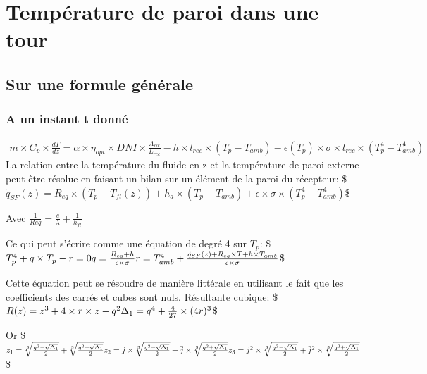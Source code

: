\documentclass[letterpaper,10pt,english]{sphinxmanual}
\begin{document}
\chapter{Température de paroi dans une tour}
\label{\detokenize{Part4/BilanT4:temperature-de-paroi-dans-une-tour}}\label{\detokenize{Part4/BilanT4::doc}}

\section{Sur une formule générale}
\label{\detokenize{Part4/BilanT4:sur-une-formule-generale}}

\subsection{A un instant t donné}
\label{\detokenize{Part4/BilanT4:a-un-instant-t-donne}}\begin{equation}\label{equation:Part4/BilanT4:eqGenTFixed}
\begin{split}
\dot{m} \times C_p \times \frac{dT}{dz} = \alpha \times \eta_{opt} \times DNI \times \frac{A_{col}}{L_{rec}} - h \times l_{rec} \times (T_p-T_{amb}) - \epsilon (T_p) \times \sigma \times l_{rec} \times (T_p^4-T_{amb}^4)
\end{split}
\end{equation}
La relation entre la température du fluide en z et la température de paroi externe peut être résolue en faisant un bilan sur un élément de la paroi du récepteur:
\$\(
\dot{q}_{SF} (z) = R_{eq}  \times (T_p -T_{fl}(z)) + h_a  \times (T_p-T_{amb} ) + \epsilon \times \sigma  \times (T_p^4-T_{amb}^4) 
\)\$

Avec \(\frac{1}{Req} = \frac{e}{\lambda}+\frac{1}{h_{fl}}\)

Ce qui peut s’écrire comme une équation de degré 4 sur \(T_p\):
\$\(
T_p^4+ q \times T_p - r =0 \\
 q= \frac{R_{eq} + h}{\epsilon \times \sigma} \\
 r = T_{amb}^4 + \frac{\dot{q}_{SF} (z) + R_{eq} \times T + h \times T_{amb} }{\epsilon \times \sigma}
\)\$

Cette équation peut se résoudre de manière littérale en utilisant le fait que les coefficients des carrés et cubes sont nuls. Résultante cubique:
\$\(
R(z) = z^3 +4 \times r \times z - q^2 \\
\Delta_1 = q^4+ \frac{4}{27} \times (4r)^3
\)\$

Or
\$\(
z_1 = \sqrt[3]{\frac{q^2-\sqrt{\Delta_1}}{2}} + \sqrt[3]{\frac{q^2+\sqrt{\Delta_1}}{2}} \\
z_2 = j \times \sqrt[3]{\frac{q^2-\sqrt{\Delta_1}}{2}} + \bar{j} \times \sqrt[3]{\frac{q^2+\sqrt{\Delta_1}}{2}}\\
z_3 = j^2 \times \sqrt[3]{\frac{q^2-\sqrt{\Delta_1}}{2}} + \bar{j}^2 \times \sqrt[3]{\frac{q^2+\sqrt{\Delta_1}}{2}}\\
\)\$
\end{document}
